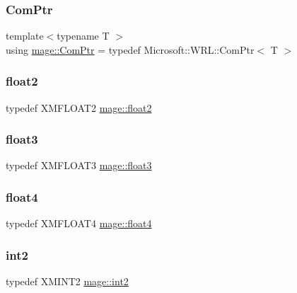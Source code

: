 \subsubsection{\texorpdfstring{Com\+Ptr}{ComPtr}}
{\footnotesize\ttfamily template$<$typename T $>$ \\
using \hyperlink{namespacemage_ae74f374780900893caa5555d1031fd79}{mage\+::\+Com\+Ptr} = typedef Microsoft\+::\+W\+R\+L\+::\+Com\+Ptr$<$ T $>$}

\hypertarget{namespacemage_a536f5856288c280080c9cdf739e85ddc}{}\label{namespacemage_a536f5856288c280080c9cdf739e85ddc} 
\subsubsection{\texorpdfstring{float2}{float2}}
{\footnotesize\ttfamily typedef X\+M\+F\+L\+O\+A\+T2 \hyperlink{namespacemage_a536f5856288c280080c9cdf739e85ddc}{mage\+::float2}}

\hypertarget{namespacemage_aab5dae4b0aaf8129b9e0d651d91d4b38}{}\label{namespacemage_aab5dae4b0aaf8129b9e0d651d91d4b38} 
\subsubsection{\texorpdfstring{float3}{float3}}
{\footnotesize\ttfamily typedef X\+M\+F\+L\+O\+A\+T3 \hyperlink{namespacemage_aab5dae4b0aaf8129b9e0d651d91d4b38}{mage\+::float3}}

\hypertarget{namespacemage_aa79484ea5211c29727b3794199ac0a55}{}\label{namespacemage_aa79484ea5211c29727b3794199ac0a55} 
\subsubsection{\texorpdfstring{float4}{float4}}
{\footnotesize\ttfamily typedef X\+M\+F\+L\+O\+A\+T4 \hyperlink{namespacemage_aa79484ea5211c29727b3794199ac0a55}{mage\+::float4}}

\hypertarget{namespacemage_aa22600b49377872988582e782d7b1fcd}{}\label{namespacemage_aa22600b49377872988582e782d7b1fcd} 
\subsubsection{\texorpdfstring{int2}{int2}}
{\footnotesize\ttfamily typedef X\+M\+I\+N\+T2 \hyperlink{namespacemage_aa22600b49377872988582e782d7b1fcd}{mage\+::int2}}

